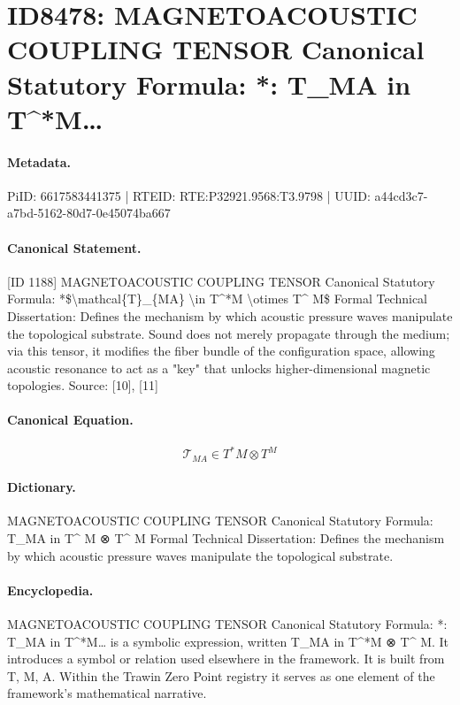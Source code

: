 \section*{ID8478: MAGNETOACOUSTIC COUPLING TENSOR Canonical Statutory Formula: *: T\_MA in T\textasciicircum{}*M…}
\paragraph{Metadata.}
PiID: 6617583441375 | RTEID: RTE:P32921.9568:T3.9798 | UUID: a44cd3c7-a7bd-5162-80d7-0e45074ba667

\paragraph{Canonical Statement.}
[ID 1188] MAGNETOACOUSTIC COUPLING TENSOR Canonical Statutory Formula: *\$\textbackslash{}mathcal\{T\}\_\{MA\} \textbackslash{}in T\textasciicircum{}*M \textbackslash{}otimes T\textasciicircum{} M\$ Formal Technical Dissertation: Defines the mechanism by which acoustic pressure waves manipulate the topological substrate. Sound does not merely propagate through the medium; via this tensor, it modifies the fiber bundle of the configuration space, allowing acoustic resonance to act as a "key" that unlocks higher-dimensional magnetic topologies. Source: [10], [11]

\paragraph{Canonical Equation.}
\[
\mathcal{T}_{MA} \in T^*M \otimes T^ M
\]

\paragraph{Dictionary.}
MAGNETOACOUSTIC COUPLING TENSOR Canonical Statutory Formula: T\_MA in T\textasciicircum{} M ⊗ T\textasciicircum{} M Formal Technical Dissertation: Defines the mechanism by which acoustic pressure waves manipulate the topological substrate.

\paragraph{Encyclopedia.}
MAGNETOACOUSTIC COUPLING TENSOR Canonical Statutory Formula: *: T\_MA in T\textasciicircum{}*M… is a symbolic expression, written T\_MA in T\textasciicircum{}*M ⊗ T\textasciicircum{} M. It introduces a symbol or relation used elsewhere in the framework. It is built from T, M, A. Within the Trawin Zero Point registry it serves as one element of the framework's mathematical narrative.
